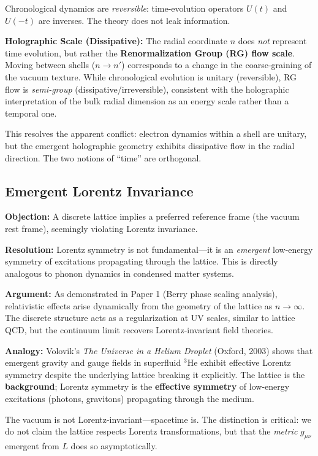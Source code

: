 \documentclass[aps,prd,twocolumn,superscriptaddress,groupedaddress,showpacs]{revtex4-2}
\begin{document}
Chronological dynamics are \emph{reversible}: time-evolution operators $U(t)$ and $U(-t)$ are inverses. The theory does not leak information.

\textbf{Holographic Scale (Dissipative):} The radial coordinate $n$ does \emph{not} represent time evolution, but rather the \textbf{Renormalization Group (RG) flow scale}. Moving between shells ($n \to n'$) corresponds to a change in the coarse-graining of the vacuum texture. While chronological evolution is unitary (reversible), RG flow is \emph{semi-group} (dissipative/irreversible), consistent with the holographic interpretation of the bulk radial dimension as an energy scale rather than a temporal one.

This resolves the apparent conflict: electron dynamics within a shell are unitary, but the emergent holographic geometry exhibits dissipative flow in the radial direction. The two notions of ``time'' are orthogonal.

\subsection{Emergent Lorentz Invariance}

\textbf{Objection:} A discrete lattice implies a preferred reference frame (the vacuum rest frame), seemingly violating Lorentz invariance.

\textbf{Resolution:} Lorentz symmetry is not fundamental---it is an \emph{emergent} low-energy symmetry of excitations propagating through the lattice. This is directly analogous to phonon dynamics in condensed matter systems.

\textbf{Argument:} As demonstrated in Paper 1 (Berry phase scaling analysis), relativistic effects arise dynamically from the geometry of the lattice as $n \to \infty$. The discrete structure acts as a regularization at UV scales, similar to lattice QCD, but the continuum limit recovers Lorentz-invariant field theories.

\textbf{Analogy:} Volovik's \emph{The Universe in a Helium Droplet} (Oxford, 2003) shows that emergent gravity and gauge fields in superfluid $^3$He exhibit effective Lorentz symmetry despite the underlying lattice breaking it explicitly. The lattice is the \textbf{background}; Lorentz symmetry is the \textbf{effective symmetry} of low-energy excitations (photons, gravitons) propagating through the medium.

The vacuum is not Lorentz-invariant---spacetime is. The distinction is critical: we do not claim the lattice respects Lorentz transformations, but that the \emph{metric} $g_{\mu\nu}$ emergent from $L$ does so asymptotically.
\end{document}

